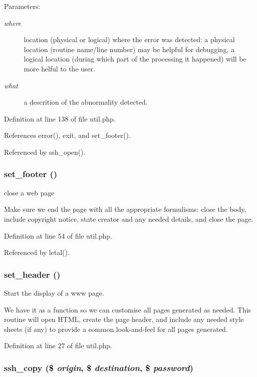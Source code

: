 \begin{Desc}
\item[Parameters:]
\begin{description}
\item[{\em where}]location (physical or logical) where the error was detected: a physical location (routine name/line number) may be helpful for debugging, a logical location (during which part of the processing it happened) will be more helful to the user.\item[{\em what}]a descrition of the abnormality detected. \end{description}
\end{Desc}


Definition at line 138 of file util.php.

References error(), exit, and set\_\-footer().

Referenced by ssh\_\-open().
\subsubsection{\setlength{\rightskip}{0pt plus 5cm}set\_\-footer ()}\label{util_8php_a1}


close a web page 

Make sure we end the page with all the appropriate formulisms: close the body, include copyright notice, state creator and any needed details, and close the page. 

Definition at line 54 of file util.php.

Referenced by letal().
\subsubsection{\setlength{\rightskip}{0pt plus 5cm}set\_\-header ()}\label{util_8php_a0}


Start the display of a www page. 

We have it as a function so we can customise all pages generated as needed. This routine will open HTML, create the page header, and include any needed style sheets (if any) to provide a common look-and-feel for all pages generated. 

Definition at line 27 of file util.php.
\subsubsection{\setlength{\rightskip}{0pt plus 5cm}ssh\_\-copy (\$ {\em origin}, \$ {\em destination}, \$ {\em password})}\label{util_8php_a6}


